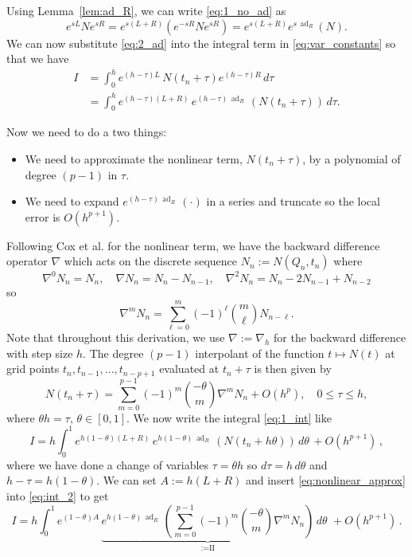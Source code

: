 \documentclass[12pt]{article}
\DeclareMathOperator{\ad}{ad}
\begin{document}
Using Lemma~\ref{lem:ad_R}, we can write \eqref{eq:1_no_ad} as
\begin{equation}
\label{eq:2_ad}
    e^{sL}Ne^{sR} = e^{s(L+R)}(e^{-sR}Ne^{sR}) = e^{s(L+R)}e^{s\,\ad_R}(N).
\end{equation}
We can now substitute \eqref{eq:2_ad} into the integral term in \eqref{eq:var_constants} so that we have 
\begin{align}
    \textit{I} &= \int_0^h e^{(h-\tau)L}\, N(t_n + \tau)e^{(h-\tau)R}\, d\tau \\
    &=\int_0^h e^{(h-\tau)(L+R)}\, e^{(h-\tau)\,\ad_R}\, (N(t_n + \tau))\, d\tau.
    \label{eq:1_int}
\end{align}

Now we need to do a two things:

\begin{itemize}
    \item We need to approximate the nonlinear term, $N(t_n + \tau)$, by a polynomial of degree $(p-1)$ in $\tau$.
    \item We need to expand $e^{(h-\tau)\,\ad_R}\,(\cdot)$ in a series and truncate so the local error is $O(h^{p+1})$.
\end{itemize}
Following Cox et al.\cite{cox-matthews:2002} for the nonlinear term, we have the backward difference operator $\nabla$ which acts on the discrete sequence $N_n := N(Q_n,t_n)$ where
\begin{equation}
    \nabla^0N_n = N_n, \quad \nabla N_n = N_n- N_{n-1}, \quad \nabla^2 N_n = N_n - 2N_{n-1} + N_{n-2}
\end{equation}
so 
\begin{equation}
    \nabla^mN_n = \sum_{\ell=0}^{m}(-1)^{\ell} \binom{m}{\ell} N_{n-\ell}.
\end{equation}
Note that throughout this derivation, we use $\nabla := \nabla_h$ for the backward difference with step size $h$.
The degree $(p-1)$ interpolant of the function $t \mapsto N(t)$ at grid points $t_n,t_{n-1}, ..., t_{n-p+1}$ evaluated at $t_n+\tau$ is then given by
\begin{equation}
\label{eq:nonlinear_approx}
    N(t_n+\tau) = \sum_{m=0}^{p-1} (-1)^m \binom{-\theta}{m}\nabla^mN_n + O(h^p), \quad 0 \leq \tau \leq h,
\end{equation}
where $\theta h =\tau,\, \theta \in [0,1]$. We now write the integral \eqref{eq:1_int} like
\begin{equation}
\label{eq:int_2}
    \textit{I} = h\int_0^1 e^{h(1-\theta)(L+R)}\, e^{h(1-\theta)\,\ad_R}\, (N(t_n + h\theta))\, d\theta \,+ O(h^{p+1})\,,
\end{equation}
where we have done a change of variables $\tau = \theta h$ so $d\tau = h\, d\theta$ and $h-\tau = h(1-\theta)$. We can set $A:=h(L+R)$ and insert \eqref{eq:nonlinear_approx} into \eqref{eq:int_2} to get
\begin{equation}
\label{eq:int_3}
        \textit{I} = h\int_0^1 e^{(1-\theta)A}\, \underbrace{e^{h(1-\theta)\,\ad_R}\, \left(\sum_{m=0}^{p-1} (-1)^m\binom{-\theta}{m}\nabla^mN_n\right)}_\text{:=II}\, d\theta \, \,+ O(h^{p+1})\, .
\end{equation}
\end{document}
